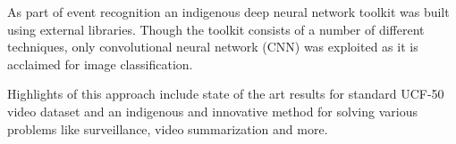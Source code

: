 \par As part of event recognition an indigenous deep neural network toolkit was built using external libraries. Though the toolkit consists of a number of different techniques, only convolutional neural network (CNN) was exploited as it is acclaimed for image classification. 

\par Highlights of this approach include state of the art results for standard UCF-50 video dataset and an indigenous and innovative method for solving various problems like surveillance, video summarization and more.  
\pagebreak